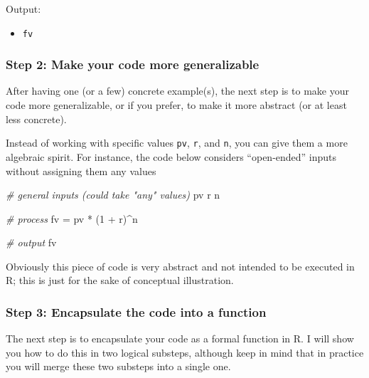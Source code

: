\documentclass[
]{book}
\newenvironment{Shaded}{\begin{snugshade}}{\end{snugshade}}
\newcommand{\CommentTok}[1]{\textcolor[rgb]{0.56,0.35,0.01}{\textit{#1}}}
\newcommand{\DecValTok}[1]{\textcolor[rgb]{0.00,0.00,0.81}{#1}}
\newcommand{\NormalTok}[1]{#1}
\newcommand{\OtherTok}[1]{\textcolor[rgb]{0.56,0.35,0.01}{#1}}
\newcommand{\SpecialCharTok}[1]{\textcolor[rgb]{0.00,0.00,0.00}{#1}}
\providecommand{\tightlist}{%
  \setlength{\itemsep}{0pt}\setlength{\parskip}{0pt}}
\begin{document}
Output:

\begin{itemize}
\tightlist
\item
  \texttt{fv}
\end{itemize}

\hypertarget{step-2-make-your-code-more-generalizable}{%
\subsubsection*{Step 2: Make your code more generalizable}\label{step-2-make-your-code-more-generalizable}}

After having one (or a few) concrete example(s), the next step is to make your
code more generalizable, or if you prefer, to make it more abstract (or at
least less concrete).

Instead of working with specific values \texttt{pv}, \texttt{r}, and \texttt{n}, you can give them
a more algebraic spirit. For instance, the code below considers ``open-ended''
inputs without assigning them any values

\begin{Shaded}
\begin{Highlighting}[]
\CommentTok{\# general inputs (could take "any" values)}
\NormalTok{pv}
\NormalTok{r}
\NormalTok{n}

\CommentTok{\# process}
\NormalTok{fv }\OtherTok{=}\NormalTok{ pv }\SpecialCharTok{*}\NormalTok{ (}\DecValTok{1} \SpecialCharTok{+}\NormalTok{ r)}\SpecialCharTok{\^{}}\NormalTok{n}

\CommentTok{\# output}
\NormalTok{fv}
\end{Highlighting}
\end{Shaded}

Obviously this piece of code is very abstract and not intended to be executed
in R; this is just for the sake of conceptual illustration.

\hypertarget{step-3-encapsulate-the-code-into-a-function}{%
\subsubsection*{Step 3: Encapsulate the code into a function}\label{step-3-encapsulate-the-code-into-a-function}}

The next step is to encapsulate your code as a formal function in R. I will
show you how to do this in two logical substeps, although keep in mind that in
practice you will merge these two substeps into a single one.
\end{document}
